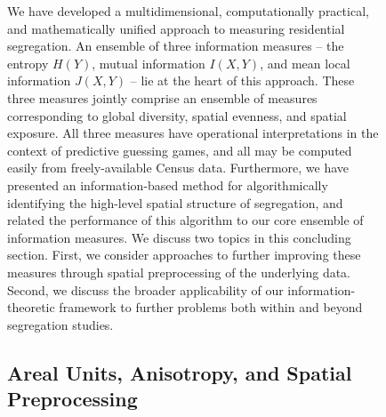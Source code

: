 \documentclass[english]{scrartcl}
\begin{document}
\begin{figure}
	We have developed a multidimensional, computationally practical, and mathematically unified approach to measuring residential segregation. An ensemble of three information measures -- the entropy $H(Y)$, mutual information $I(X,Y)$, and mean local information $J(X,Y)$ -- lie at the heart of this approach. These three measures jointly comprise an ensemble of measures corresponding to global diversity, spatial evenness, and spatial exposure. All three measures have operational interpretations in the context of predictive guessing games, and all may be computed easily from freely-available Census data. Furthermore, we have presented an information-based method for algorithmically identifying the high-level spatial structure of segregation, and related the performance of this algorithm to our core ensemble of information measures. We discuss two topics in this concluding section. First, we consider approaches to further improving these measures through spatial preprocessing of the underlying data. Second, we discuss the broader applicability of our information-theoretic framework to further problems both within and beyond segregation studies. 

	\subsection*{Areal Units, Anisotropy, and Spatial Preprocessing}


\end{figure}
\end{document}
